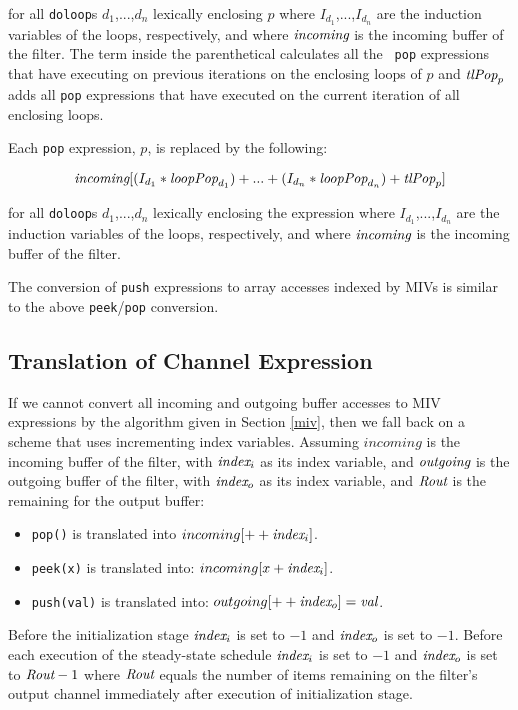 \documentclass[10pt, letterpaper, onecolumn]{article}
\begin{document}
for all {\tt doloop}s $d_1$,...,$d_n$ lexically enclosing $p$ where
$I_{d_1}$,...,$I_{d_n}$ are the induction variables of the loops,
respectively, and where $\mbox{\it incoming}$ is the incoming buffer of the
filter.  The term inside the parenthetical calculates all the {\tt
pop} expressions that have executing on previous iterations on the
enclosing loops of $p$ and $\mbox{\it tlPop}_p$ adds all {\tt pop}
expressions that have executed on the current iteration of all
enclosing loops.

Each {\tt pop} expression, $p$, is replaced by the following:

\begin{displaymath}
\mbox{\it incoming}[(I_{d_1} * \mbox{\it loopPop}_{d_1}) + ... + 
(I_{d_n} * \mbox{\it loopPop}_{d_n}) + \mbox{\it tlPop}_p]
\end{displaymath}

for all {\tt doloop}s $d_1$,...,$d_n$ lexically enclosing the
expression where $I_{d_1}$,...,$I_{d_n}$ are the induction variables of
the loops, respectively, and where $\mbox{\it incoming}$ is the incoming buffer
of the filter.  

The conversion of {\tt push} expressions to array accesses indexed by MIVs
is similar to the above {\tt peek}/{\tt pop} conversion. 

\subsection{Translation of Channel Expression}
\label{convertchannel}
If we cannot convert all incoming and outgoing buffer accesses to
MIV expressions by the algorithm given in Section \ref{miv}, then we fall back
on a scheme that uses incrementing index variables.  Assuming
$incoming$ is the incoming buffer of the filter, with
$\mbox{\it index}_i$ as its index variable, and $\mbox{\it outgoing}$ is the
outgoing buffer of the filter, with $\mbox{\it index}_o$ as its index
variable, and $\mbox{\it Rout}$ is the remaining for the output buffer:

\begin{itemize}
\item {\tt pop()} is translated into ${incoming}[++\mbox{\it index}_i]$.
\item {\tt peek(x)} is translated into: ${incoming}[x + \mbox{\it index}_i]$.
\item {\tt push(val)} is translated into: ${outgoing}[++\mbox{\it index}_o]
  = \mbox{\it val}$.
\end{itemize}

Before the initialization stage $\mbox{\it index}_i$ is set to $-1$ and
$\mbox{\it index}_o$ is set to $-1$.  Before each execution of the
steady-state schedule $\mbox{\it index}_i$ is set to $-1$ and
$\mbox{\it index}_o$ is set to $\mbox{\it Rout} - 1$ where $\mbox{\it Rout}$ equals the
number of items remaining on the filter's output channel immediately after execution of
initialization stage.
\end{document}
